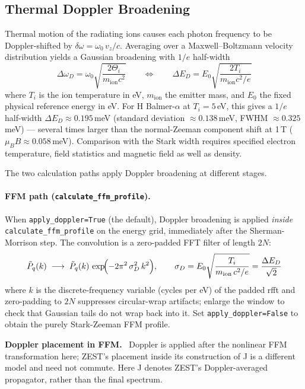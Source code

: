 \documentclass[11pt,a4paper]{article}
\newenvironment{caveat}[1][Caveat]{%
  \par\smallskip\noindent\begin{lrbox}{\notebox}\setlength{\fboxsep}{6pt}\begin{minipage}{\dimexpr\linewidth-2\fboxsep-2\fboxrule\relax}\small\textbf{#1.}\ }{%
  \end{minipage}\end{lrbox}\setlength{\fboxsep}{6pt}\fcolorbox{warnframe}{warnbg}{\usebox{\notebox}}\par\smallskip}
\numberwithin{equation}{section}
\begin{document}
\subsection{Thermal Doppler Broadening}
\label{sec:doppler}

Thermal motion of the radiating ions causes each photon frequency to be Doppler-shifted by $\delta\omega = \omega_0\, v_z/c$. Averaging over a Maxwell--Boltzmann velocity distribution yields a Gaussian broadening with $1/e$ half-width
\begin{equation}
\Delta\omega_D = \omega_0 \sqrt{\frac{2 \Theta_i}{m_\mathrm{ion} c^2}}
\qquad\Longleftrightarrow\qquad
\Delta E_D = E_0 \sqrt{\frac{2 T_i}{m_\mathrm{ion} c^2 / e}}
\end{equation}
where $T_i$ is the ion temperature in eV, $m_\mathrm{ion}$ the emitter mass, and $E_0$ the fixed physical reference energy in eV. For H Balmer-$\alpha$ at $T_i = 5$\,eV, this gives a $1/e$ half-width $\Delta E_D \approx 0.195$\,meV (standard deviation $\approx 0.138$\,meV, FWHM $\approx 0.325$\,meV) — several times larger than the normal-Zeeman component shift at 1\,T ($\mu_B B \approx 0.058$\,meV). Comparison with the Stark width requires specified electron temperature, field statistics and magnetic field as well as density.

The two calculation paths apply Doppler broadening at different stages.

\paragraph{FFM path (\texttt{calculate\_ffm\_profile}).}
When \texttt{apply\_doppler=True} (the default), Doppler broadening is applied \emph{inside}
\texttt{calculate\_ffm\_\allowbreak{}profile} on the energy grid, immediately after the Sherman-Morrison
step.  The convolution is a zero-padded FFT filter of length $2N$:
\begin{equation}
\tilde{P}_q(k) \;\longrightarrow\; \tilde{P}_q(k)\,
\exp\!\Bigl(-2\pi^2\,\sigma_D^2\,k^2\Bigr),
\qquad \sigma_D = E_0\sqrt{\frac{T_i}{m_\mathrm{ion}\,c^2/e}}
               = \frac{\Delta E_D}{\sqrt{2}}
\end{equation}
where $k$ is the discrete-frequency variable (cycles per eV) of the padded rfft and
zero-padding to $2N$ suppresses circular-wrap artifacts; enlarge the window to
check that Gaussian tails do not wrap back into it. Set \texttt{apply\_doppler=False}
to obtain the purely Stark-Zeeman FFM profile.

\begin{caveat}[Doppler placement in FFM]
Doppler is applied after the nonlinear FFM transformation here; ZEST's placement
inside its construction of J is a different model and need not commute.
Here J denotes ZEST's Doppler-averaged propagator, rather than the final spectrum.
\end{caveat}
\end{document}
